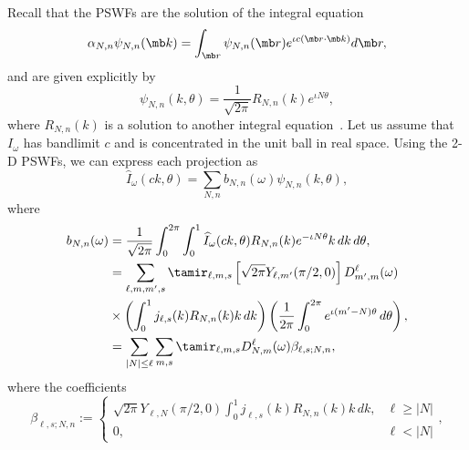 \documentclass[9pt,twocolumn,twoside,lineno]{pnas-new}
\begin{document}
Recall that the PSWFs are the solution of the integral equation  
\begin{equation}
\label{eq:PSWF_defn_eq}
\alpha_{N,n}\psi_{N,n}(\mb k) = \int_{\mb r} \psi_{N,n}(\mb r)e^{\iota c(\mb r\cdot\mb k)}d\mb r,
\end{equation}
and are given explicitly by 
\[ \psi_{N,n}(k,\theta) = \frac{1}{\sqrt{2\pi}}R_{N,n}(k)e^{\iota N\theta},\]
where $R_{N,n}(k)$ is a solution to another integral equation~\cite{landa2017steerable}. 
Let us assume that $I_{\omega}$ has bandlimit $c$ and is concentrated in the unit ball in real space. 
Using the 2-D PSWFs, we can express each projection as 
\[ \widehat I_{\omega}(ck,\theta) = \sum_{N,n}b_{N,n}(\omega)\psi_{N,n}(k,\theta),\]
%
where
\[\begin{aligned} b_{N,n}(\omega) &= \frac{1}{\sqrt{2\pi}}\int_0^{2\pi}\int_0^1\widehat I_{\omega}(ck,\theta)R_{N,n}(k)e^{-\iota N\theta}k\, dk\, d\theta,\\
&= \sum_{\ell,m,m',s}\tamir_{\ell,m,s}\left[\sqrt{2\pi}Y_{\ell,m'}(\pi/2,0)\right]D_{m',m}^{\ell}(\omega)\\&\times \left(\int_0^1j_{\ell,s}(k)R_{N,n}(k)k\, dk\right)\left(\frac{1}{2\pi}\int_0^{2\pi}e^{\iota(m'-N)\theta}\, d\theta\right),\\
&= \sum_{\vert N\vert\leq \ell}\sum_{m,s}\tamir_{\ell,m,s}D_{N,m}^{\ell}(\omega)\beta_{\ell,s;N,n},\end{aligned}\]
where the coefficients
\begin{equation} \label{eq:beta}
\beta_{\ell,s;N,n} := \left\{\begin{array}{ll} \sqrt{2\pi}Y_{\ell,N}(\pi/2,0)\int_0^1j_{\ell,s}(k)R_{N,n}(k)k\, dk, & \ell\geq |N|\\ 0, & \ell<|N|\end{array}\right.,
\end{equation}
\end{document}
